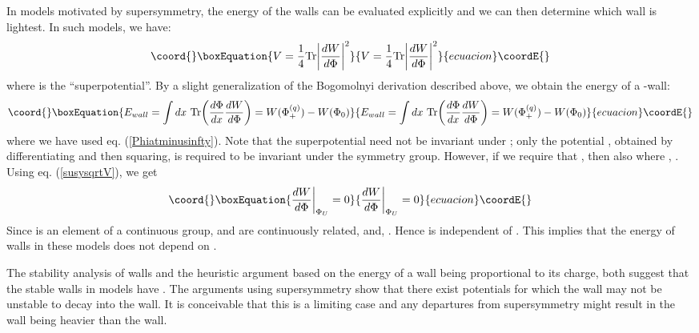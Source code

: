 \documentclass[a4paper,prd,nofootinbib,twocolumn,showpacs]{revtex4}
\begin{document}
In models motivated by supersymmetry, the energy of the walls 
can be evaluated explicitly and we can then determine which wall
is lightest. In such models, we have:
\begin{equation}\coord{}\boxEquation{
V = {1\over 4}{\rm Tr} \biggl | {{dW}\over {d\Phi}} \biggr |^2
\label{susysqrtV}
}{
V = {1\over 4}{\rm Tr} \biggl | {{dW}\over {d\Phi}} \biggr |^2
}{ecuacion}\coordE{}\end{equation}
where \coordHE{} is the ``superpotential''. By a slight
generalization of the Bogomolnyi derivation described above,
we obtain the energy of a \coordHE{}-wall:
\begin{equation}\coord{}\boxEquation{
E_{wall} = 
  \int dx ~ {\rm Tr} \biggl ( 
  {{d\Phi}\over {dx}} {{dW}\over {d\Phi}} \biggr ) 
=  W(\Phi_+^{(q)}) - W (\Phi_0)  
\label{susywallenergy}
}{
E_{wall} = 
  \int dx ~ {\rm Tr} \biggl ( 
  {{d\Phi}\over {dx}} {{dW}\over {d\Phi}} \biggr ) 
=  W(\Phi_+^{(q)}) - W (\Phi_0)  
}{ecuacion}\coordE{}\end{equation}
where we have used eq. (\ref{Phiatminusinfty}). 
Note that the superpotential need not be invariant under 
\coordHE{}; only the potential \coordHE{}, obtained
by differentiating \coordHE{} and then squaring, is required to be
invariant under the symmetry group. However, if we require
that \coordHE{}, then also \coordHE{} where 
\coordHE{}, \coordHE{}. Using
eq. (\ref{susysqrtV}), we get
\begin{equation}\coord{}\boxEquation{
{{dW}\over {d\Phi}} \bigg | _{\Phi_U}  =0 
\label{dWoverdPhi}
}{
{{dW}\over {d\Phi}} \bigg | _{\Phi_U}  =0 
}{ecuacion}\coordE{}\end{equation}
Since \coordHE{} is an element of a continuous group, \coordHE{} and 
\coordHE{} are continuously related, and, \coordHE{}. 
Hence \coordHE{} is independent of \coordHE{}. This implies
that the energy of walls in these models does not depend
on \coordHE{}. 

The stability analysis of \coordHE{} walls and the heuristic
argument based on the energy of a wall being proportional
to its charge, both suggest that the stable walls in
\coordHE{} models have \coordHE{}. The arguments using
supersymmetry show that there exist potentials for which
the \coordHE{} wall may not be unstable to decay into the \coordHE{}
wall. It is conceivable that this is a limiting case and any 
departures from supersymmetry might result in the \coordHE{} wall 
being heavier than the \coordHE{} wall.
\end{document}
